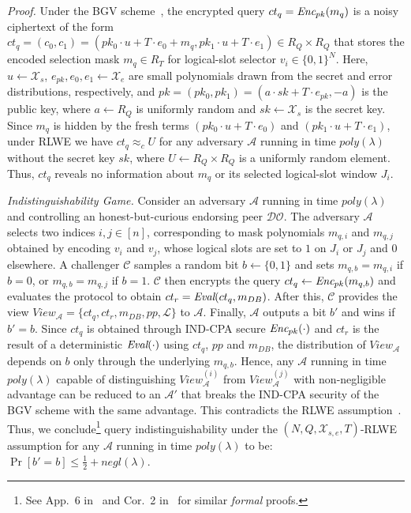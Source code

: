 \documentclass{ieeetj}
\begin{document}
\emph{Proof.}
Under the BGV scheme~\cite{cryptoeprint:2011/277}, the encrypted query $ct_q = \emph{Enc}_{pk}(m_q)$ is a noisy ciphertext of the form
$ct_q = (c_0, c_1) = (pk_0 \cdot u + T \cdot e_0 + m_q, pk_1 \cdot u + T \cdot e_1) \in R_Q \times R_Q$
that stores the encoded selection mask $m_q \in R_T$ for logical-slot selector $v_i \in \{0,1\}^N$. Here,
$u\leftarrow\mathcal{X}_s$, $e_{pk},e_0,e_1\leftarrow\mathcal{X}_e$ are small polynomials drawn from
the secret and error distributions, respectively, and $pk = (pk_0, pk_1) = (a \cdot sk + T \cdot e_{pk}, -a)$ is the public key,
where $a \leftarrow R_Q$ is uniformly random and $sk \leftarrow \mathcal{X}_s$ is the secret key. Since $m_q$ is hidden by the fresh
terms $(pk_0\cdot u+T\cdot e_0)$ and $(pk_1\cdot u+T\cdot e_1)$, under RLWE we have $ct_q \approx_c U$ for any adversary $\mathcal{A}$ running in
time $poly(\lambda)$ without the secret key $sk$, where $U\leftarrow R_Q \times R_Q$ is a uniformly random element.
Thus, $ct_q$ reveals no information about $m_q$ or its selected logical-slot window $J_i$.

\emph{Indistinguishability Game.}
Consider an adversary $\mathcal{A}$ running in time $poly(\lambda)$ and controlling an honest-but-curious endorsing peer $\mathcal{DO}$.
The adversary $\mathcal{A}$ selects two indices $i,j \in [n]$, corresponding to mask polynomials $m_{q,i}$ and $m_{q,j}$ obtained by
encoding $v_i$ and $v_j$, whose logical slots are set to $1$ on $J_i$ or $J_j$ and $0$ elsewhere.
A challenger $\mathcal{C}$ samples a random bit $b \leftarrow \{0,1\}$ and sets
$m_{q,b} = m_{q,i}$ if $b=0$, or $m_{q,b} = m_{q,j}$ if $b=1$. $\mathcal{C}$ then encrypts the query
$ct_q \gets \emph{Enc}_{pk}(m_{q,b})$ and evaluates the protocol to obtain $ct_r = \emph{Eval}(ct_q, m_{DB})$. 
After this, $\mathcal{C}$ provides the view $View_{\mathcal{A}} = \{ct_q, ct_r, m_{DB}, pp, \mathcal{L}\}$ to $\mathcal{A}$. 
Finally, $\mathcal{A}$ outputs a bit $b'$ and wins if $b' = b$.
Since $ct_q$ is obtained through IND-CPA secure $\emph{Enc}_{pk}(\cdot)$ and $ct_r$ is the result of a deterministic $\emph{Eval}(\cdot)$ 
using $ct_q$, $pp$ and $m_{DB}$, the distribution of $View_{\mathcal{A}}$ depends on $b$ only through the underlying $m_{q,b}$.
Hence, any $\mathcal{A}$ running in time $poly(\lambda)$ capable of distinguishing $View_{\mathcal{A}}^{(i)}$ from 
$View_{\mathcal{A}}^{(j)}$ with non-negligible advantage can be reduced to an $\mathcal{A'}$ that breaks the IND-CPA security of the BGV scheme 
with the same advantage. This contradicts the RLWE assumption~\cite{peikert_lattice_2014}. Thus, we conclude\footnote{See App.~6 
in~\cite{mahdavi_inspire_2025} and Cor.~2 in~\cite{simplepir_2023} for similar \emph{formal} proofs.} query indistinguishability 
under the $(N,Q,\mathcal{X}_{s,e},T)$-RLWE assumption for any $\mathcal{A}$ running in time $poly(\lambda)$ to be:
$\Pr[b' = b] \leq \tfrac{1}{2} + negl(\lambda)$.
\end{document}
